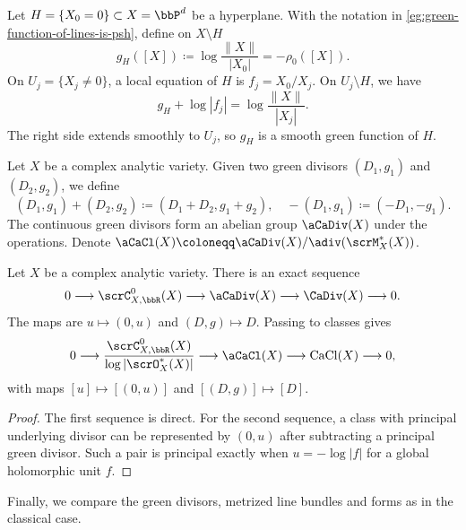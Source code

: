 \begin{example}[label=\labelNFM{eg:green-function-of-a-line}, status=draft, tag=0000000]
    Let $H = \{X_0 = 0\} \subset X = \bbP^d$ be a hyperplane.
    With the notation in \cref{eg:green-function-of-lines-is-psh}, define on $X \setminus H$
    \[ g_H([X]) \coloneqq \log\frac{\|X\|}{|X_0|} = -\rho_0([X]). \]
    On $U_j = \{X_j \neq 0\}$, a local equation of $H$ is $f_j = X_0/X_j$.
    On $U_j \setminus H$, we have
    \[ g_H + \log|f_j| = \log\frac{\|X\|}{|X_j|}. \]
    The right side extends smoothly to $U_j$, so $g_H$ is a smooth green function of $H$.
\end{example}

\begin{definition}[label=\labelNFM{def:group-of-green-divisors}, status=draft, tag=0000000]
		Let $X$ be a complex analytic variety.
	Given two green divisors $(D_1,g_1)$ and $(D_2,g_2)$, we define
  \[ (D_1,g_1) + (D_2,g_2) \coloneqq (D_1 + D_2,g_1 + g_2), \quad
		-(D_1,g_1) \coloneqq (-D_1,-g_1). \]
		The continuous green divisors form an abelian group $\aCaDiv(X)$ under the operations.
    Denote $\aCaCl(X) \coloneqq \aCaDiv(X)/\adiv(\scrM_X^*(X))$.
\end{definition}

\begin{proposition}[label=\labelNFM{prop:group-of-green-divisors}, status=draft, tag=0000000]
  Let $X$ be a complex analytic variety.
There is an exact sequence
		\[ 0 \longrightarrow \scrC_{X,\bbR}^0(X) \longrightarrow \aCaDiv(X) \longrightarrow \CaDiv(X) \longrightarrow 0. \]
		The maps are $u \mapsto (0,u)$ and $(D,g) \mapsto D$.
		Passing to classes gives
		\[ 0 \longrightarrow \frac{\scrC_{X,\bbR}^0(X)}{\log|\scrO_X^*(X)|} \longrightarrow \aCaCl(X) \longrightarrow \operatorname{CaCl}(X) \longrightarrow 0, \]
		with maps $[u] \mapsto [(0,u)]$ and $[(D,g)] \mapsto [D]$.
\end{proposition}
\begin{proof}
  The first sequence is direct.
	For the second sequence, a class with principal underlying divisor can be represented by $(0,u)$ after subtracting a principal green divisor.
	Such a pair is principal exactly when $u = -\log|f|$ for a global holomorphic unit $f$.
\end{proof}

Finally, we compare the green divisors, metrized line bundles and forms as in the classical case.

